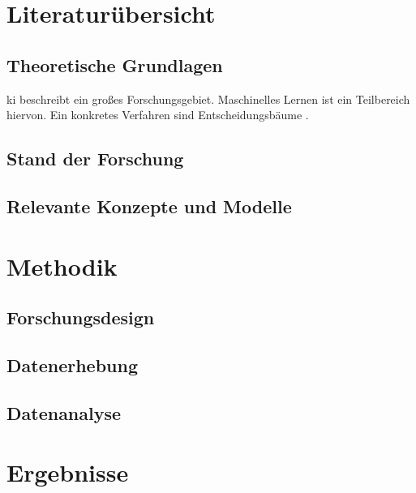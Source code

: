 \documentclass[twoside=false,DIV=8]{scrbook}
\begin{document}
\lipsum[5-8]

\chapter{Literaturübersicht}

\section{Theoretische Grundlagen}

\Gls{ki} beschreibt ein großes Forschungsgebiet. Maschinelles Lernen ist ein Teilbereich hiervon. Ein konkretes Verfahren sind Entscheidungsbäume \autocite{knuth_2021}.

\lipsum[1-2]

\section{Stand der Forschung}

\lipsum[2]

\section{Relevante Konzepte und Modelle}

\lipsum[3-5]


\chapter{Methodik}

\section{Forschungsdesign}

\lipsum[1]

\section{Datenerhebung}

\lipsum[2]

\section{Datenanalyse}

\lipsum[3]

\chapter{Ergebnisse}
\end{document}
